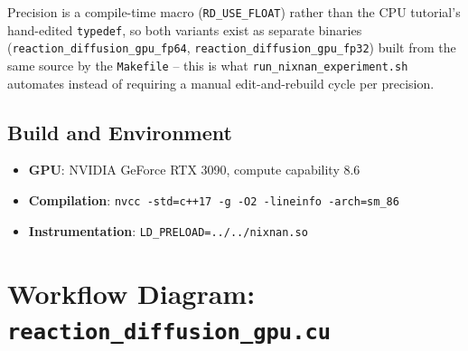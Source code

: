\documentclass[11pt,a4paper]{article}
\begin{document}
Precision is a compile-time macro (\texttt{RD\_USE\_FLOAT}) rather than the
CPU tutorial's hand-edited \texttt{typedef}, so both variants exist as
separate binaries (\texttt{reaction\_diffusion\_gpu\_fp64},
\texttt{reaction\_diffusion\_gpu\_fp32}) built from the same source by the
\texttt{Makefile} -- this is what \texttt{run\_nixnan\_experiment.sh}
automates instead of requiring a manual edit-and-rebuild cycle per
precision.

\subsection{Build and Environment}
\begin{itemize}
  \item \textbf{GPU}: NVIDIA GeForce RTX 3090, compute capability 8.6
  \item \textbf{Compilation}: \texttt{nvcc -std=c++17 -g -O2 -lineinfo -arch=sm\_86}
  \item \textbf{Instrumentation}: \texttt{LD\_PRELOAD=../../nixnan.so}
\end{itemize}

\section{Workflow Diagram: \texttt{reaction\_diffusion\_gpu.cu}}
\label{sec:workflow}

\begin{center}
\end{center}
\end{document}
